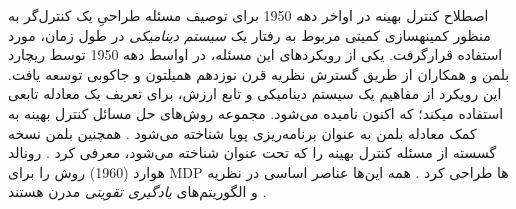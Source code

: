 
اصطلاح کنترل بهینه
در اواخر دهه 1950
برای توصیف مسئله طراحیِ یک کنترل‌گر به منظور کمینه\nf سازی کمیتی مربوط به رفتار یک \textit{سیستم دینامیکی} در طول زمان، مورد استفاده قرارگرفت. یکی از رویکردهای این مسئله، در اواسط دهه 1950 توسط ریچارد بلمن و همکاران از طریق گسترش نظریه قرن نوزدهم همیلتون و جاکوبی
 توسعه یافت. این رویکرد از مفاهیم 
\textit{}
 یک سیستم دینامیکی و تابع ارزش، برای تعریف یک معادله تابعی استفاده می\nf کند؛ که اکنون 
 \textit{
 }
  نامیده می‌شود. مجموعه روش‌های حل مسائل کنترل بهینه به کمک معادله بلمن به عنوان برنامه‌ریزی پویا شناخته می‌شود
  \cite{bellman1957dynamic}.
   همچنین بلمن نسخه گسسته از مسئله کنترل بهینه را که تحت عنوان 
  \textit{
  } 
شناخته می‌شود، معرفی کرد
\cite{bellman1957markovian}.
 رونالد هوارد (1960) روش 
\textit{
}
را برای MDP‌‌ ها طراحی کرد
\cite{howard1960dynamic}. 
همه این‌ها عناصر اساسی در نظریه و الگوریتم‌های \textit{یادگیری تقویتی} مدرن هستند
\cite{suttonbook}.


